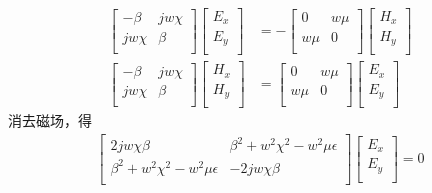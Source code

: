\documentclass{article}
\numberwithin{equation}{section}
\begin{document}
\begin{align}
    \label{eq:eq508}
    \left[
        \begin{matrix}
            -\beta & jw\chi \\
            jw\chi & \beta \\
        \end{matrix}
    \right]
    \left[
        \begin{matrix}
            E_x \\
            E_y \\
        \end{matrix}
    \right]&=-
    \left[
        \begin{matrix}
            0 & w\mu \\
            w\mu & 0 \\
        \end{matrix}
    \right]
    \left[
        \begin{matrix}
            H_x \\
            H_y \\
        \end{matrix}
    \right] \\
    \label{eq:eq509}
    \left[
        \begin{matrix}
            -\beta & jw\chi \\
            jw\chi & \beta \\
        \end{matrix}
    \right]
    \left[
        \begin{matrix}
            H_x \\
            H_y \\
        \end{matrix}
    \right]&=
    \left[
        \begin{matrix}
            0 & w\mu \\
            w\mu & 0 \\
        \end{matrix}
    \right]
    \left[
        \begin{matrix}
            E_x \\
            E_y \\
        \end{matrix}
    \right]
\end{align}
消去磁场，得
\begin{align}
    \label{eq:eq510}
    \left[
        \begin{matrix}
            2jw\chi\beta & \beta^2+w^2\chi^2-w^2\mu\epsilon \\
            \beta^2+w^2\chi^2-w^2\mu\epsilon & -2jw\chi\beta \\
        \end{matrix}
    \right]
    \left[
        \begin{matrix}
            E_x \\
            E_y \\
        \end{matrix}
    \right]=0
\end{align}
\end{document}
